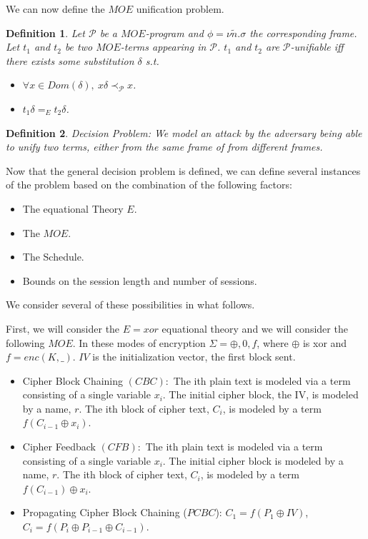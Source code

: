 \documentclass[11pt,twoside,a4paper]{article}
\newtheorem{definition}{Definition}
\begin{document}
We can now define the $MOE$ unification problem.

\begin{definition}
	Let $\mathcal{P}$ be a $MOE$-program and $\phi = \nu \tilde{n}.\sigma$ the corresponding frame. Let $t_1$ and $t_2$
	be two $MOE$-terms appearing in $\mathcal{P}$. $t_1$ and $t_2$
	are $\mathcal{P}$-unifiable iff there exists some substitution
	$\delta$ s.t.
	\begin{itemize}
		\item $\forall x \in Dom(\delta), ~x\delta \prec_{\mathcal{P}} x$.
		\item $t_1 \delta =_E t_2\delta$.
	\end{itemize}
\end{definition}


\begin{definition}
	Decision Problem: We model an attack by the adversary being able
	to unify two terms, either from the same frame of from different
	frames.  
\end{definition}

Now that the general decision problem is defined, we can define several
instances of the problem based on the combination of the following factors:
\begin{itemize}
	\item The equational Theory $E$.
	\item The $MOE$.
	\item The Schedule.
	\item Bounds on the session length and number of sessions.  
\end{itemize}

We consider several of these possibilities in what follows.

First, we will consider the $E=xor$ equational theory and we 
will consider the following $MOE$. In these modes of encryption 
$\Sigma ={\oplus, 0, f}$, where $\oplus$ is xor and $f=enc(K,\_)$.
$IV$ is the initialization vector, the first block sent. 
\begin{itemize}
	\item Cipher Block Chaining $(CBC):$ The ith plain text is modeled via a term consisting of a single variable $x_i$. The initial cipher block, the IV, is modeled by a name, $r$. The ith block of cipher text, $C_i$, is modeled by a
	term $f(C_{i-1} \oplus x_i)$.
	\item Cipher Feedback $(CFB):$ The ith plain text is modeled via a term consisting of a single variable $x_i$. The initial cipher block is modeled by a name, $r$. The ith block of cipher text, $C_i$, is modeled by a
	term $f(C_{i-1}) \oplus x_i$.  
	\item Propagating Cipher Block Chaining ($PCBC$): 
	$C_1 = f(P_1 \oplus IV)$, $C_i = f(P_i \oplus P_{i-1} \oplus C_{i-1})$.
\end{itemize}
\end{document}
